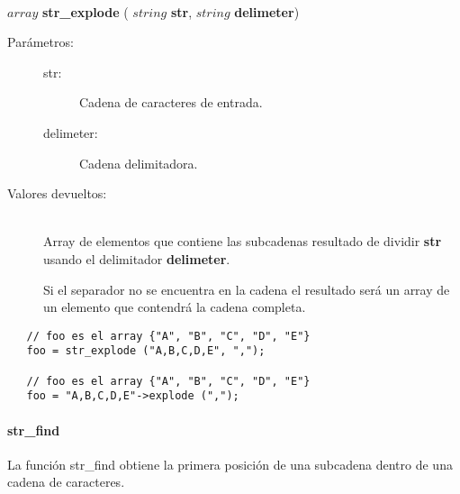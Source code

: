\begin{framed}
\hfill \\ $array$ \textbf{str\_explode} ( $string$ \textbf{str}, $string$ \textbf{delimeter})  
\begin{description}
\item [Parámetros:] \hfill 
   \begin{description}
   \item[str:] Cadena de caracteres de entrada.
   \item[delimeter:] Cadena delimitadora.
   \end{description}
\item[Valores devueltos:] \hfill \\
   Array de elementos que contiene las subcadenas resultado de dividir \textbf{str} usando el delimitador \textbf{delimeter}.
   
   Si el separador no se encuentra en la cadena el resultado será un array de un elemento que contendrá la cadena completa.
\end{description}
\end{framed}


\begin{lstlisting}
   // foo es el array {"A", "B", "C", "D", "E"}
   foo = str_explode ("A,B,C,D,E", ","); 
   
   // foo es el array {"A", "B", "C", "D", "E"}
   foo = "A,B,C,D,E"->explode (",");
\end{lstlisting}

\paragraph {str\_find}
La función str\_find obtiene la primera posición de una subcadena dentro de una cadena de caracteres. 

